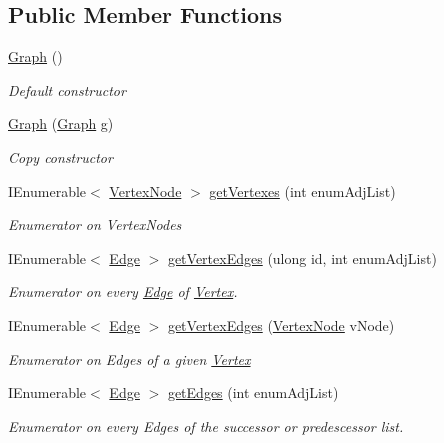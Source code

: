 \subsection*{Public Member Functions}
\begin{DoxyCompactItemize}
\item 
\hyperlink{classGraph_ab8ccb82fd216cc5a36c3887c6820428f}{Graph} ()
\begin{DoxyCompactList}\small\item\em Default constructor \end{DoxyCompactList}\item 
\hyperlink{classGraph_a7dfaf3d08909226f2ccd75e4addc3edb}{Graph} (\hyperlink{classGraph}{Graph} g)
\begin{DoxyCompactList}\small\item\em Copy constructor \end{DoxyCompactList}\item 
I\+Enumerable$<$ \hyperlink{classVertexNode}{Vertex\+Node} $>$ \hyperlink{classGraph_a9bb1945939e97eb4fe194f1fd2867154}{get\+Vertexes} (int enum\+Adj\+List)
\begin{DoxyCompactList}\small\item\em Enumerator on Vertex\+Nodes \end{DoxyCompactList}\item 
I\+Enumerable$<$ \hyperlink{classEdge}{Edge} $>$ \hyperlink{classGraph_a7ec7de88b4b0c0c103a3342dd2be2c12}{get\+Vertex\+Edges} (ulong id, int enum\+Adj\+List)
\begin{DoxyCompactList}\small\item\em Enumerator on every \hyperlink{classEdge}{Edge} of \hyperlink{structVertex}{Vertex}. \end{DoxyCompactList}\item 
I\+Enumerable$<$ \hyperlink{classEdge}{Edge} $>$ \hyperlink{classGraph_a6b9f1276ad4846478a91e1969e75ba6f}{get\+Vertex\+Edges} (\hyperlink{classVertexNode}{Vertex\+Node} v\+Node)
\begin{DoxyCompactList}\small\item\em Enumerator on Edges of a given \hyperlink{structVertex}{Vertex} \end{DoxyCompactList}\item 
I\+Enumerable$<$ \hyperlink{classEdge}{Edge} $>$ \hyperlink{classGraph_a70efb9ad83b09661b3e395926848b108}{get\+Edges} (int enum\+Adj\+List)
\begin{DoxyCompactList}\small\item\em Enumerator on every Edges of the successor or predescessor list. \end{DoxyCompactList}\item 

\end{DoxyCompactItemize}

